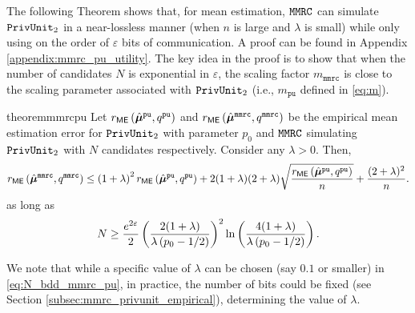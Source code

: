 The following Theorem shows that, for mean estimation, $\texttt{MMRC}$ can simulate $\texttt{PrivUnit}_2$ in a near-lossless manner (when $n$ is large and $\lambda$ is small) while only using on the order of $\varepsilon$ bits of communication.
A proof can be found in Appendix \ref{appendix:mmrc_pu_utility}. The key idea in the proof is to show that when the number of candidates $N$ is exponential in $\varepsilon$, the scaling factor $m_{\texttt{mmrc}}$ is close to the scaling parameter associated with $\texttt{PrivUnit}_2$ (i.e., $m_{\texttt{pu}}$ defined in \eqref{eq:m}).

\begin{restatable}{theorem}{mmrcpu}
\label{thm:me_mmrc_pu}
Let $r_{\mathsf{ME}} \left( \hat{{\boldsymbol{\mu}}}^\texttt{pu}, q^{\texttt{pu}} \right)$ and $r_{\mathsf{ME}} \left( \hat{{\boldsymbol{\mu}}}^\texttt{mmrc}, q^{\texttt{mmrc}} \right)$ be the empirical mean estimation error for \emph{$\texttt{PrivUnit}_2$} with parameter $p_0$ and \emph{$\texttt{MMRC}$} simulating \emph{$\texttt{PrivUnit}_2$} with $N$ candidates respectively. Consider any $\lambda > 0$. Then,
\begin{align}
    r_{\mathsf{ME}} \left( \hat{{\boldsymbol{\mu}}}^\texttt{mmrc}, q^{\texttt{mmrc}} \right) \leq \left( 1+\lambda \right)^2 r_{\mathsf{ME}} \left( \hat{{\boldsymbol{\mu}}}^\texttt{pu}, q^{\texttt{pu}} \right) + 2(1+\lambda)(2+\lambda) \sqrt{\frac{r_{\mathsf{ME}} \left( \hat{{\boldsymbol{\mu}}}^\texttt{pu}, q^{\texttt{pu}} \right)}{n}} + \frac{(2+\lambda)^2}{n}.
\end{align}
as long as 
\begin{align}\label{eq:N_bdd_mmrc_pu}
    N \geq   \frac{e^{2\varepsilon}}{2}\left(\frac{2 (1+\lambda)}{\lambda \left( p_0 -1/2 \right)}\right)^2 \ln\left( \frac{4(1+\lambda)}{\lambda \left( p_0 -1/2 \right)} \right).
\end{align}
\end{restatable}
We note that while a specific value of $\lambda$ can be chosen (say $0.1$ or smaller) in \eqref{eq:N_bdd_mmrc_pu}, in practice, the number of bits could be fixed (see Section \ref{subsec:mmrc_privunit_empirical}), determining the value of $\lambda$.

